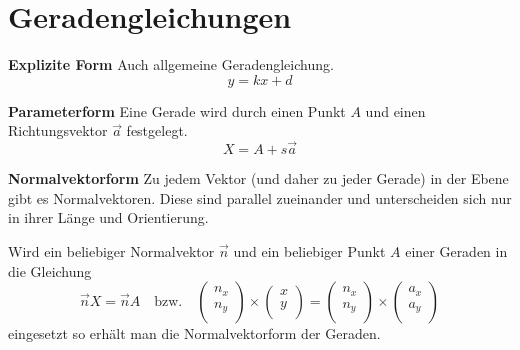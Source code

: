 \documentclass[twocolumn]{article}
\newcommand{\topic}[1]{\noindent\textbf{#1}}
\begin{document}
\section{Geradengleichungen}

\topic{Explizite Form} Auch allgemeine Geradengleichung.
\begin{equation*}
    y = kx + d
\end{equation*}

\topic{Parameterform} Eine Gerade wird durch einen Punkt $A$ und einen Richtungsvektor $\Vec{a}$ festgelegt.
\begin{equation*}
    X = A +s\Vec{a}
\end{equation*}

\topic{Normalvektorform} Zu jedem Vektor (und daher zu jeder Gerade) in der Ebene gibt es Normalvektoren. Diese sind parallel zueinander und unterscheiden sich nur in ihrer Länge und Orientierung.

Wird ein beliebiger Normalvektor $\Vec{n}$ und ein beliebiger Punkt $A$ einer Geraden in die Gleichung
\begin{equation*}
    \Vec{n}X = \Vec{n}A\quad \mathrm{bzw.}\quad \begin{pmatrix}n_x \\ n_y \\\end{pmatrix} \times \begin{pmatrix}x \\ y \\\end{pmatrix} = \begin{pmatrix}n_x \\ n_y \\\end{pmatrix} \times \begin{pmatrix}a_x \\ a_y \\\end{pmatrix}
\end{equation*}
eingesetzt so erhält man die Normalvektorform der Geraden.
\end{document}
